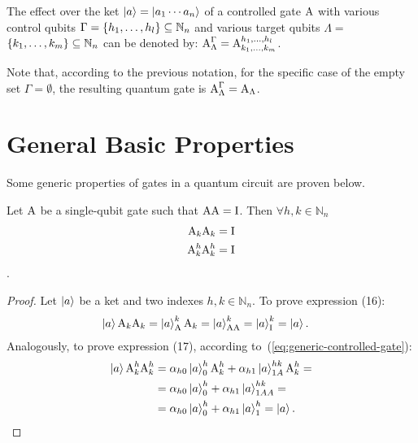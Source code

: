 \documentclass[sigconf,natbib=false]{acmart}
\begin{document}
	\begin{notation}
		The effect over the  ket $\ket{a}=\ket{a_1\cdots a_n}$ of a controlled gate $\text{A}$ with various control qubits $\Gamma=\{h_1,\dots,h_l\}\subseteq\mathbb{N}_n$  and various target qubits $\Lambda=$ $\text{ }$ $\{k_1,\dots,k_m\}\subseteq\mathbb{N}_n$ can be denoted by:
		$\text{A}^{\Gamma}_{\Lambda}=\text{A}^{h_1,\dots,h_l}_{k_1,\dots, k_m}$.
	\end{notation}
	Note that, according to the previous notation, for the specific case of the empty set $\Gamma=\emptyset$, the resulting quantum gate is $\text{A}^{\Gamma}_{\Lambda}=\text{A}_{\Lambda}$.

	\section{General Basic Properties}
	Some generic properties of  gates in a quantum circuit are proven below.
	\begin{proposition}
		Let $\text{A}$ be a single-qubit gate such that $\text{A}\text{A}=\text{I}$. Then $\forall h,k \in \mathbb{N}_n$
		\begin{align}
			\label{eq:puerta-involutiva}
			\text{A}_k\text{A}_k &= \text{I}\\
			\text{A}^{h}_{k}\text{A}^{h}_{k} &= \text{I}
		\end{align}
		.
	\end{proposition}
	\begin{proof}
		Let $\ket{a}$ be a ket and two indexes $h,k \in \mathbb{N}_n$.
		To prove expression (16):
		\begin{align*}
			\ket{a}\text{A}_k\text{A}_k
			&=\ket{a}^{k}_{\text{A}}\text{A}_k=\ket{a}^k_{\text{AA}}=\ket{a}^{k}_{\text{I}}=\ket{a}.
		\end{align*}
		Analogously, to prove expression (17), according to~(\ref{eq:generic-controlled-gate}):
		\begin{align*}
			\ket{a}\text{A}^{h}_{k}\text{A}^{h}_{k}
			&=\alpha_{h0}\ket{a}^{h}_{0}\text{A}^{h}_{k}+\alpha_{h1}\ket{a}^{hk}_{1A}\text{A}^{h}_{k}=\\
			&=\alpha_{h0}\ket{a}^{h}_{0}+\alpha_{h1}\ket{a}^{hk}_{1AA}=\\
			&=\alpha_{h0}\ket{a}^{h}_{0}+\alpha_{h1}\ket{a}^{h}_{1}=\ket{a}.
		\end{align*}
	\end{proof}
\end{document}
